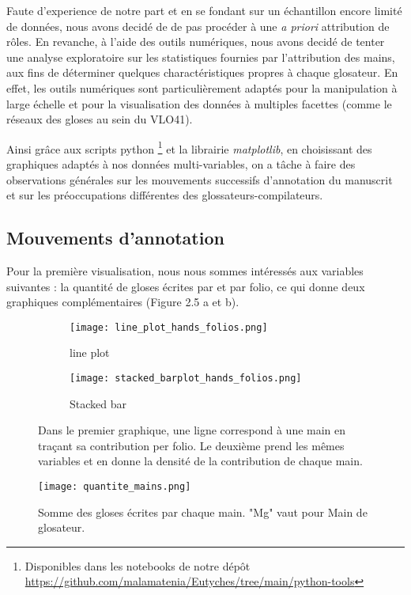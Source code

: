 \documentclass[a4paper, twoside, 12pt]{book}
\begin{document}
Faute d'experience de notre part et en se fondant sur un échantillon encore limité de données, nous avons decidé de de pas procéder à une \textit{a priori} attribution de rôles. En revanche, à l'aide des outils numériques, nous avons decidé de tenter une \og{} analyse exploratoire \fg{} sur les statistiques fournies par l'attribution des mains, aux fins de déterminer quelques charactéristiques propres à chaque glosateur. En effet, les outils numériques sont particulièrement adaptés pour la manipulation à large échelle et pour la visualisation des données à multiples facettes (comme le réseaux des gloses au sein du VLO41).

Ainsi grâce aux scripts python \footnote{Disponibles dans les notebooks de notre dépôt \url{https://github.com/malamatenia/Eutyches/tree/main/python-tools}} et la librairie \textit{matplotlib}, en choisissant des graphiques adaptés à nos données multi-variables, on a tâche à faire des observations générales sur les mouvements successifs d'annotation du manuscrit et sur les préoccupations différentes des glossateurs-compilateurs.\\

\subsection{Mouvements d'annotation}

Pour la première visualisation, nous nous sommes intéressés aux variables suivantes : la quantité de gloses écrites par et par folio, ce qui donne deux graphiques complémentaires (Figure 2.5 a et b).

\begin{figure}[H]
    \begin{subfigure}{0.50\textwidth}
    \centering
    \texttt{[image: line\_plot\_hands\_folios.png]}
    \caption{line plot}
    \end{subfigure}
    \begin{subfigure}{0,50\linewidth}
    \centering
    \texttt{[image: stacked\_barplot\_hands\_folios.png]}
    \caption{Stacked bar}
    \end{subfigure}
    \caption{Dans le premier graphique, une ligne correspond à une main en traçant sa contribution per folio. Le deuxième prend les mêmes variables et en donne la densité de la contribution de chaque main.}
\end{figure} 

\begin{figure}[H]
    \centering
    \texttt{[image: quantite\_mains.png]}
    \caption{Somme des gloses écrites par chaque main. "Mg" vaut pour Main de glosateur.}
\end{figure}
\end{document}
